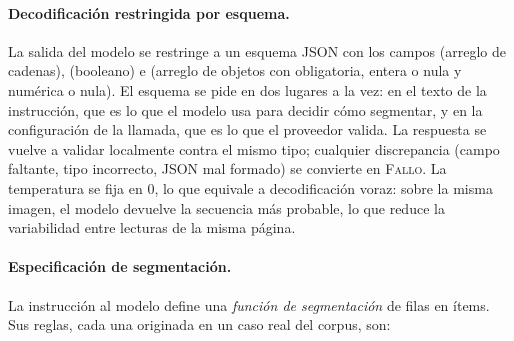 \paragraph{Decodificación restringida por esquema.} La salida del modelo se
restringe a un esquema JSON con los campos  (arreglo de cadenas),
 (booleano) e  (arreglo de objetos con
 obligatoria,  entera o nula y 
numérica o nula). El esquema se pide en dos lugares a la vez: en el texto de la
instrucción, que es lo que el modelo usa para decidir cómo segmentar, y en la
configuración de la llamada, que es lo que el proveedor valida. La respuesta se
vuelve a validar localmente contra el mismo tipo; cualquier discrepancia
(campo faltante, tipo incorrecto, JSON mal formado) se convierte en
\textsc{Fallo}. La temperatura se fija en $0$, lo que equivale a decodificación
voraz: sobre la misma imagen, el modelo devuelve la secuencia más probable, lo
que reduce la variabilidad entre lecturas de la misma página.

\paragraph{Especificación de segmentación.} La instrucción al modelo define una
\emph{función de segmentación} de filas en ítems. Sus reglas, cada una
originada en un caso real del corpus, son:

